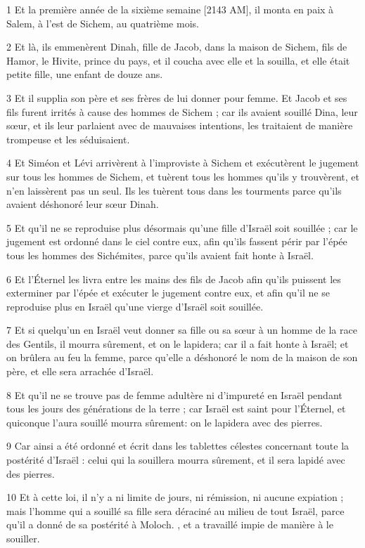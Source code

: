 \par 1 Et la première année de la sixième semaine [2143 AM], il monta en paix à Salem, à l'est de Sichem, au quatrième mois.
\par 2 Et là, ils emmenèrent Dinah, fille de Jacob, dans la maison de Sichem, fils de Hamor, le Hivite, prince du pays, et il coucha avec elle et la souilla, et elle était petite fille, une enfant de douze ans.
\par 3 Et il supplia son père et ses frères de lui donner pour femme. Et Jacob et ses fils furent irrités à cause des hommes de Sichem ; car ils avaient souillé Dina, leur sœur, et ils leur parlaient avec de mauvaises intentions, les traitaient de manière trompeuse et les séduisaient.
\par 4 Et Siméon et Lévi arrivèrent à l'improviste à Sichem et exécutèrent le jugement sur tous les hommes de Sichem, et tuèrent tous les hommes qu'ils y trouvèrent, et n'en laissèrent pas un seul. Ils les tuèrent tous dans les tourments parce qu'ils avaient déshonoré leur sœur Dinah.
\par 5 Et qu'il ne se reproduise plus désormais qu'une fille d'Israël soit souillée ; car le jugement est ordonné dans le ciel contre eux, afin qu'ils fassent périr par l'épée tous les hommes des Sichémites, parce qu'ils avaient fait honte à Israël.
\par 6 Et l'Éternel les livra entre les mains des fils de Jacob afin qu'ils puissent les exterminer par l'épée et exécuter le jugement contre eux, et afin qu'il ne se reproduise plus en Israël qu'une vierge d'Israël soit souillée.
\par 7 Et si quelqu'un en Israël veut donner sa fille ou sa sœur à un homme de la race des Gentils, il mourra sûrement, et on le lapidera; car il a fait honte à Israël; et on brûlera au feu la femme, parce qu'elle a déshonoré le nom de la maison de son père, et elle sera arrachée d'Israël.
\par 8 Et qu'il ne se trouve pas de femme adultère ni d'impureté en Israël pendant tous les jours des générations de la terre ; car Israël est saint pour l'Éternel, et quiconque l'aura souillé mourra sûrement: on le lapidera avec des pierres.
\par 9 Car ainsi a été ordonné et écrit dans les tablettes célestes concernant toute la postérité d'Israël : celui qui la souillera mourra sûrement, et il sera lapidé avec des pierres.
\par 10 Et à cette loi, il n'y a ni limite de jours, ni rémission, ni aucune expiation ; mais l'homme qui a souillé sa fille sera déraciné au milieu de tout Israël, parce qu'il a donné de sa postérité à Moloch. , et a travaillé impie de manière à le souiller.
